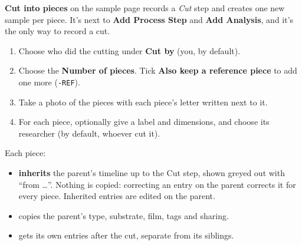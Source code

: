 \documentclass[11pt,a4paper]{article}
\newcommand{\ui}[1]{\textsf{\textbf{#1}}}
\newcommand{\sid}[1]{\texttt{#1}}
\begin{document}
\ui{Cut into pieces} on the sample page records a \emph{Cut} step and
creates one new sample per piece. It's next to \ui{Add Process Step} and
\ui{Add Analysis}, and it's the only way to record a cut.

\begin{enumerate}
  \item Choose who did the cutting under \ui{Cut by} (you, by default).
  \item Choose the \ui{Number of pieces}. Tick \ui{Also keep a reference
        piece} to add one more (\sid{-REF}).
  \item Take a photo of the pieces with each piece's letter written next to it.
  \item For each piece, optionally give a label and dimensions, and choose
        its researcher (by default, whoever cut it).
\end{enumerate}

\begin{center}
\end{center}

Each piece:
\begin{itemize}
  \item \textbf{inherits} the parent's timeline up to the Cut step, shown
        greyed out with ``from \ldots''. Nothing is copied: correcting an
        entry on the parent corrects it for every piece. Inherited entries
        are edited on the parent.
  \item copies the parent's type, substrate, film, tags and sharing.
  \item gets its own entries after the cut, separate from its siblings.
\end{itemize}
\end{document}
